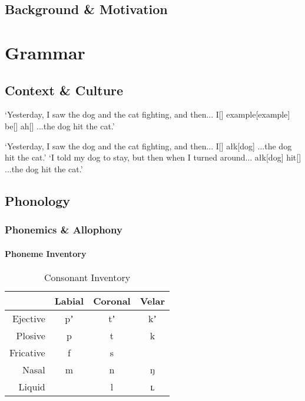 \documentclass[a4paper,11pt,oneside,openany]{memoir}
\begin{document}
\begin{titlingpage}
\titleP
\end{titlingpage}
\frontmatter

\chapter{Background \& Motivation}
\clearpage
\tableofcontents


\printnoidxglossary[type=\leipzigtype,title={Glossing Abbreviations}]

\mainmatter

\part{\parentlang{} Grammar}

\chapter{Context \& Culture}

\Blindtext[2]

\ex
\begingl
\glpreamble
`Yesterday, I saw the dog and the cat fighting, and then...
\endpreamble
I[\Fsg]
example[example]
be[\Spl]
ah[\Acc]
\glft ...the dog hit the cat.'
\endgl
\xe

\Blindtext[3]

\pex
\a
\begingl
\glpreamble
`Yesterday, I saw the dog and the cat fighting, and then...
\endpreamble
I[\Fsg]
a\l k[dog]
\glft ...the dog hit the cat.'
\endgl
\a 
\begingl
\glpreamble
`I told my dog to stay, but then when I turned around...
\endpreamble
a\l k[dog]
hit[\Sarg]
\glft ...the dog hit the cat.'
\endgl
\xe

\Blindtext[1]

\chapter{Phonology}

\section{Phonemics \& Allophony}

\subsection{Phoneme Inventory}

\begin{table}[h]
    \centering
    \begin{tabular}{@{}rccc@{}}
    \toprule
     & Labial & Coronal & Velar \\ \midrule
    Ejective & pʼ & tʼ & kʼ \\
    Plosive & p & t & k \\
    Fricative & f & s & \\
    Nasal & m & n & ŋ \\
    Liquid &  & l & ʟ \\ \bottomrule
    \end{tabular}
    \caption{Consonant Inventory}
    \label{tab:enl-consonants}
\end{table}
\end{document}
